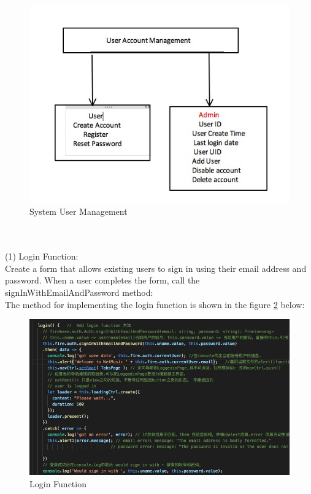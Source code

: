 \begin{figure}[h]
	\centering
	\includegraphics[scale=0.5]{img/UserManage.png}
	\caption{System User Management}
	\label{fig:6.12 cubed graph}
\end{figure}
\\ \\ (1) Login Function: \\
Create a form that allows existing users to sign in using their email address and password. When a user completes the form, call the signInWithEmailAndPassword method:
\\
The method for implementing the login function is shown in the figure \ref{fig:6.13 cubed graph} below:
\begin{figure}[h]
	\centering
	\includegraphics[scale=0.4]{img/Loginfunction.png}
	\caption{Login Function}
	\label{fig:6.13 cubed graph}
\end{figure}
